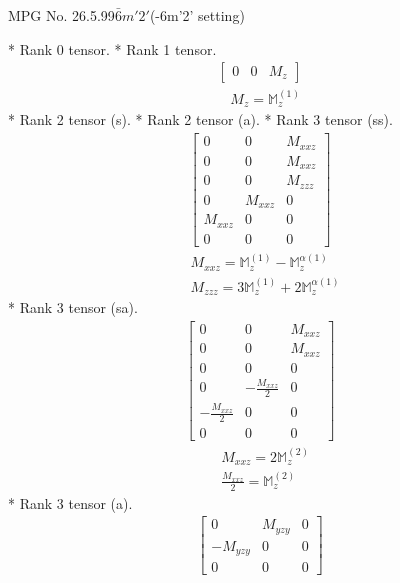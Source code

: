\documentclass[fleqn,8pt,landscape]{jsarticle}
\begin{document}
\setcounter{MaxMatrixCols}{32}

\renewcommand{\tablename}{Table~}
\renewcommand{\figurename}{Figure~}
\begin{center}
\LARGE
MPG No. 26.5.99\quad$\bar{6}m'2'$\quad(-6m'2' setting)
\end{center}
* Rank 0 tensor.
* Rank 1 tensor.
\begin{align*}
\begin{bmatrix} 0 & 0 & M_{z} \end{bmatrix}
\end{align*}
\begin{align*}
& M_{z} = \mathbb{M}_{z}^{(1)}
\end{align*}
* Rank 2 tensor (s).
* Rank 2 tensor (a).
* Rank 3 tensor (ss).
\begin{align*}
\begin{bmatrix} 0 & 0 & M_{xxz} \\ 0 & 0 & M_{xxz} \\ 0 & 0 & M_{zzz} \\ 0 & M_{xxz} & 0 \\ M_{xxz} & 0 & 0 \\ 0 & 0 & 0 \end{bmatrix}
\end{align*}
\begin{align*}
& M_{xxz} = \mathbb{M}_{z}^{(1)} - \mathbb{M}_{z}^{\alpha(1)} \\
& M_{zzz} = 3 \mathbb{M}_{z}^{(1)} + 2 \mathbb{M}_{z}^{\alpha(1)}
\end{align*}
* Rank 3 tensor (sa).
\begin{align*}
\begin{bmatrix} 0 & 0 & M_{xxz} \\ 0 & 0 & M_{xxz} \\ 0 & 0 & 0 \\ 0 & - \frac{M_{xxz}}{2} & 0 \\ - \frac{M_{xxz}}{2} & 0 & 0 \\ 0 & 0 & 0 \end{bmatrix}
\end{align*}
\begin{align*}
& M_{xxz} = 2 \mathbb{M}_{z}^{(2)} \\
& \frac{M_{xxz}}{2} = \mathbb{M}_{z}^{(2)}
\end{align*}
* Rank 3 tensor (a).
\begin{align*}
\begin{bmatrix} 0 & M_{yzy} & 0 \\ - M_{yzy} & 0 & 0 \\ 0 & 0 & 0 \end{bmatrix}
\end{align*}
\end{document}
